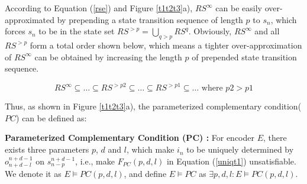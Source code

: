 \documentclass[journal]{IEEEtran}
\begin{document}
According to Equation (\ref{rse}) and Figure \ref{t1t2t3}a),
$RS^{\infty}$ can be easily over-approximated by prepending a state transition sequence of length $p$ to $s_{n}$,
which forces $s_{n}$ to be in the state set $RS^{>p}=\bigcup_{q>p} RS^{q}$.
Obviously,
$RS^{\infty}$ and all $RS^{>p}$ form a total order shown below,
which means a tighter over-approximation of $RS^{\infty}$ can be obtained by increasing the length $p$ of prepended state transition sequence.

\begin{displaymath}
RS^{\infty}\subseteq\dots \subseteq RS^{>p2}\subseteq\dots \subseteq RS^{> p1}\subseteq\dots \textrm{  where } p2>p1
\end{displaymath}

\begin{figure*}[t]
\begin{center}
\end{center}
\caption{The three unique conditions}
  \label{t1t2t3}
\end{figure*}

Thus,
as shown in Figure \ref{t1t2t3}a),
the parameterized complementary condition($PC$)\cite{ShengYuShen:iccad09} can be defined as:

\begin{definition11}\label{def_pcc}%
\textbf{Parameterized Complementary Condition ($\boldsymbol{PC}$) :}
For encoder $E$,
there exists three parameters $p$, $d$ and $l$,
which make $i_n$ to be uniquely determined by $o_{n+d-l}^{n+d-1}$ on $s_{n-p}^{n+d-1}$,
i.e.,
make $F_{PC}(p,d,l)$ in Equation (\ref{uniqt1}) unsatisfiable.
We denote it as $E\vDash PC(p,d,l)$,
and define $E\vDash PC$ as $\exists p,d,l:E\vDash PC(p,d,l)$.



\end{definition11}

\begin{equation}\label{uniqt1}
\end{equation}

\end{document}
